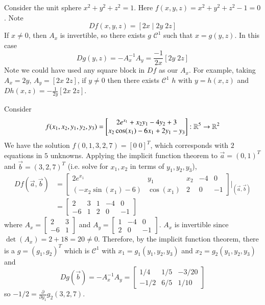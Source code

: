 \begin{eg}
    Consider the unit sphere $x^2+y^2+z^2=1.$ Here $f(x,y,z) = x^2+y^2+z^2 - 1 = 0$. Note $$Df(x,y,z) = [2x\; \vert\; 2y\;2z]$$ If $x \neq 0$, then $A_x$ is invertible, so there exists $g$ $\mathcal{C}^1$ such that $x = g(y,z)$. In this case $$Dg(y,z) = -A_x^{-1}A_y = \frac{-1}{2x}[2y\;2z]$$ Note we could have used any square block in $Df$ as our $A_x$. For example, taking $A_x = 2y$, $A_y = [2x\;2z]$, if $y \neq 0$ then there exists $\mathcal{C}^1$ $h$ with $y = h(x,z)$ and $Dh(x,z) = -\frac{1}{2y}[2x\;2z]$.
\end{eg}


\begin{eg}
    Consider $$f(x_1,x_2,y_1,y_2,y_3) = \begin{bmatrix} 2e^{x_1}+x_2y_1-4y_2+3 \\ x_2\cos(x_1)-6x_1+2y_1-y_3\end{bmatrix}:\mathbb R^5\rightarrow \mathbb R^2$$
    We have the solution $f(0,1,3,2,7) = [0\;0]^T$, which corresponds with $2$ equations in $5$ unknowns. Applying the implicit function theorem to $\vec{a} = (0,1)^T$ and $\vec{b} = (3,2,7)^T$ (i.e. solve for $x_1,x_2$ in terms of $y_1,y_2,y_3$), \begin{align*}
        Df(\vec{a},\vec{b}) &= \begin{bmatrix} 2e^{x_1} & y_1 & x_2 & -4 & 0 \\ (-x_2\sin(x_1) - 6) & \cos(x_1) & 2 & 0 & -1 \end{bmatrix}\Bigg\rvert_{(\vec{a},\vec{b})} \\
        &= \begin{bmatrix} 2 & 3 & 1 & -4 & 0 \\ -6 & 1 & 2 & 0 & -1 \end{bmatrix}
    \end{align*}
    where $A_x = \begin{bmatrix} 2 & 3 \\ -6 & 1\end{bmatrix}$ and $A_y = \begin{bmatrix} 1 & -4 & 0 \\ 2 & 0 & -1\end{bmatrix}$. $A_x$ is invertible since $\det(A_x) = 2+18 = 20 \neq 0$. Therefore, by the implicit function theorem, there is a $g = (g_1,g_2)^T$ which is $\mathcal{C}^1$ with $x_1 = g_1(y_1,y_2,y_3)$ and $x_2 = g_2(y_1,y_2,y_3)$ and $$Dg(\vec{b}) = -A_x^{-1}A_y = \begin{bmatrix} 1/4 & 1/5 & -3/20 \\ -1/2 & 6/5 & 1/10 \end{bmatrix}$$ so $-1/2 = \frac{\partial }{\partial y_1}g_2(3,2,7)$.



\end{eg}
